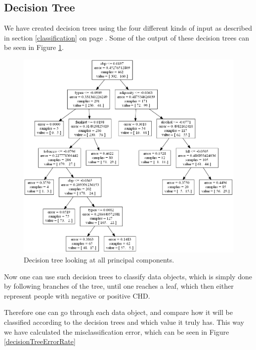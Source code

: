 \subsection{Decision Tree}

We have created decision trees using the four different kinds of input as described in section \ref{classification} on page \pageref{classification}. Some of the output of these decision trees can be seen in Figure \ref{decisionTreeXPA}.

\begin{figure}[H]
\center
	\includegraphics[scale=0.25]{pictures/Decision_Tree_XPC.png}
	\caption{Decision tree looking at all principal components.}
	\label{decisionTreeXPA}
\end{figure}

Now one can use such decision trees to classify data objects, which is simply done by following branches of the tree, until one reaches a leaf, which then either represent people with negative or positive CHD.

Therefore one can go through each data object, and compare how it will be classified according to the decision trees and which value it truly has. This way we have calculated the misclassification error, which can be seen in Figure \ref{decisionTreeErrorRate}

